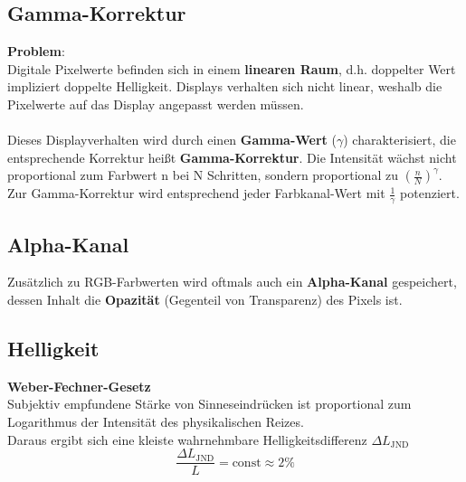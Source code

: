\subsection{Gamma-Korrektur}%
\label{bfp:sub:gamma_korrektur}

\textbf{Problem}:\\
Digitale Pixelwerte befinden sich in einem \textbf{linearen Raum}, d.h. doppelter Wert impliziert doppelte Helligkeit. Displays verhalten sich nicht linear, weshalb die Pixelwerte auf das Display angepasst werden müssen.
\\\\
Dieses Displayverhalten wird durch einen \textbf{Gamma-Wert} ($\gamma$) charakterisiert, die entsprechende Korrektur heißt \textbf{Gamma-Korrektur}. Die Intensität wächst nicht proportional zum Farbwert n bei N Schritten, sondern proportional zu $(\frac{n}{N})^{\gamma}$. Zur Gamma-Korrektur wird entsprechend jeder Farbkanal-Wert mit $\frac{1}{\gamma}$ potenziert.

\subsection{Alpha-Kanal}%
\label{bfp:sub:alpha_kanal}

Zusätzlich zu RGB-Farbwerten wird oftmals auch ein \textbf{Alpha-Kanal} gespeichert, dessen Inhalt die \textbf{Opazität} (Gegenteil von Transparenz) des Pixels ist.

\newpage
\subsection{Helligkeit}%
\label{bfp:sub:helligkeit}

\textbf{Weber-Fechner-Gesetz}\\
Subjektiv empfundene Stärke von Sinneseindrücken ist proportional zum Logarithmus der Intensität des
physikalischen Reizes.\\

Daraus ergibt sich eine kleiste wahrnehmbare Helligkeitsdifferenz $\Delta L_\text{JND}$
$$\frac{\Delta L_\text{JND}}{L} = \text{const} \approx 2\%$$
\begin{figure}[!h]
	\centering
\end{figure}

